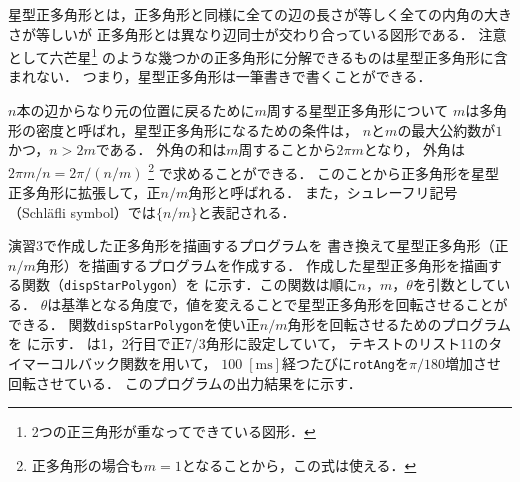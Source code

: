 

\vspace{-\baselineskip}



星型正多角形とは，正多角形と同様に全ての辺の長さが等しく全ての内角の大きさが等しいが
正多角形とは異なり辺同士が交わり合っている図形である．
注意として六芒星\footnote{2つの正三角形が重なってできている図形．}
のような幾つかの正多角形に分解できるものは星型正多角形に含まれない．
つまり，星型正多角形は一筆書きで書くことができる．\cite{Star}

$n$本の辺からなり元の位置に戻るために$m$周する星型正多角形について
$m$は多角形の密度と呼ばれ，星型正多角形になるための条件は，
$n$と$m$の最大公約数が$1$かつ，$n > 2m$である．
外角の和は$m$周することから$2\pi m$となり，
外角は$2\pi m / n = 2\pi / (n/m)$
\footnote{正多角形の場合も$m=1$となることから，この式は使える．}
で求めることができる．
このことから正多角形を星型正多角形に拡張して，正$n/m$角形と呼ばれる．
また，シュレーフリ記号（Schläfli symbol）では$\{n/m\}$と表記される．



演習3で作成した正多角形を描画するプログラムを
書き換えて星型正多角形（正$n/m$角形）を描画するプログラムを作成する．
作成した星型正多角形を描画する関数（\texttt{dispStarPolygon}）を
に示す．この関数は順に$n$，$m$，$\theta$を引数としている．
$\theta$は基準となる角度で，値を変えることで星型正多角形を回転させることができる．
関数\texttt{dispStarPolygon}を使い正$n/m$角形を回転させるためのプログラムを
に示す．
は1，2行目で正7/3角形に設定していて，
テキストのリスト11のタイマーコルバック関数を用いて，
$100\;[\mathrm{ms}]$経つたびに\texttt{rotAng}を$\pi/180$増加させ回転させている．
このプログラムの出力結果をに示す．




